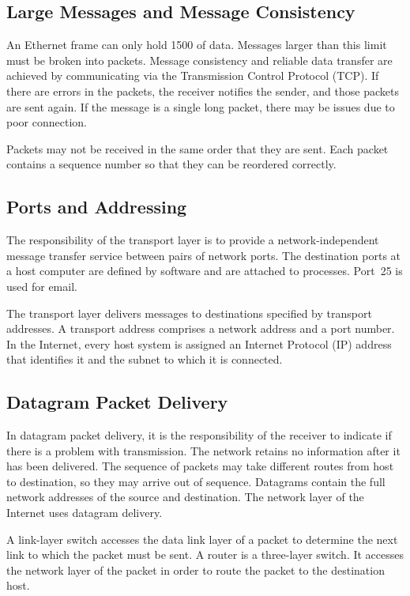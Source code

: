 {\color{gray}
\subsection{Large Messages and Message Consistency}
An Ethernet frame can only hold \SI{1500}{\byte} of data.
Messages larger than this limit must be broken into packets.
Message consistency and reliable data transfer are achieved by communicating via the Transmission Control Protocol (TCP).
If there are errors in the packets, the receiver notifies the sender, and those packets are sent again.
If the message is a single long packet, there may be issues due to poor connection.

Packets may not be received in the same order that they are sent.
Each packet contains a sequence number so that they can be reordered correctly.

\subsection{Ports and Addressing}
The responsibility of the transport layer is to provide a network-independent message transfer service between pairs of network ports.
The destination ports at a host computer are defined by software and are attached to processes.
Port~\num{25} is used for email.

The transport layer delivers messages to destinations specified by transport addresses.
A transport address comprises a network address and a port number.
In the Internet, every host system is assigned an Internet Protocol (IP) address that identifies it and the subnet to which it is connected.

\subsection{Datagram Packet Delivery}
In datagram packet delivery, it is the responsibility of the receiver to indicate if there is a problem with transmission.
The network retains no information after it has been delivered.
The sequence of packets may take different routes from host to destination, so they may arrive out of sequence.
Datagrams contain the full network addresses of the source and destination.
The network layer of the Internet uses datagram delivery.

A link-layer switch accesses the data link layer of a packet to determine the next link to which the packet must be sent.
A router is a three-layer switch.
It accesses the network layer of the packet in order to route the packet to the destination host.
}